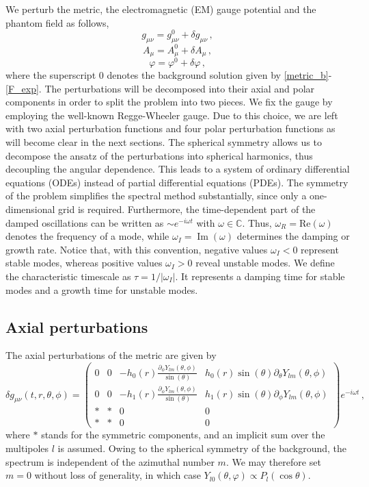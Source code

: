 \documentclass[11pt,a4paper]{article}
\begin{document}
We perturb the metric, the electromagnetic (EM) gauge potential and the phantom field as follows,
\begin{equation}
    g_{\mu\nu}=g_{\mu\nu}^0+\delta g_{\mu\nu} \, ,
\end{equation}
%
\begin{equation}
    A_{\mu}=A_{\mu}^0+\delta A_{\mu} \, ,
\end{equation}
%
\begin{equation}
    \varphi=\varphi^0+\delta\varphi \, ,
\end{equation}
where the superscript $0$ denotes the background solution given by \eqref{metric_b}-\eqref{F_exp}. 
The perturbations will be decomposed into their axial and polar components in order to split the problem into two pieces. 
We fix the gauge by employing the well-known Regge-Wheeler gauge. 
Due to this choice, we are left with two axial perturbation functions and four polar perturbation functions as will become clear in the next sections.
The spherical symmetry allows us to decompose the ansatz of the perturbations into spherical harmonics, thus decoupling the angular dependence.
This leads to a system of ordinary differential equations (ODEs) instead of partial differential equations (PDEs). 
The symmetry of the problem simplifies the spectral method substantially, since only a one-dimensional grid is required.
Furthermore, the time-dependent part of the damped oscillations can be written as $\sim e^{-i\omega t}$ with $\omega\in \mathbb{C}$. 
Thus, $\omega_R=\text{Re}(\omega)$ denotes the frequency of a mode, while $\omega_I=\operatorname{Im}(\omega)$ determines the damping or growth rate.
Notice that, with this convention, negative values $\omega_I<0$ represent stable modes, whereas positive values $\omega_I>0$ reveal unstable modes. 
We define the characteristic timescale as $\tau=1/|\omega_I|$. 
It represents a damping time for stable modes and a growth time for unstable modes.


\subsection{Axial perturbations}


The axial perturbations of the metric are given by
%
\begin{equation}\label{deltag_axial}
    \delta g_{\mu\nu}(t,r,\theta,\phi)=\begin{pmatrix}
0 & 0 & -h_0(r)\frac{\partial_{\phi}Y_{lm}(\theta,\phi)}{\sin{(\theta)}} & h_0(r)\sin{(\theta)}\partial_{\theta}Y_{lm}(\theta,\phi)\\
0 & 0 & -h_1(r)\frac{\partial_{\phi}Y_{lm}(\theta,\phi)}{\sin{(\theta)}} & h_1(r)\sin{(\theta)}\partial_{\phi}Y_{lm}(\theta,\phi)\\
* & * & 0 & 0\\
* & * & 0 & 0
\end{pmatrix}e^{-i\omega t} \,,
\end{equation}
%
where $*$ stands for the symmetric components, and an implicit sum over the multipoles $l$ is assumed. 
% 
Owing to the spherical symmetry of the background, the spectrum is independent of the azimuthal number $m$. 
We may therefore set $m=0$ without loss of generality, in which case $Y_{l0}(\theta,\varphi)\propto P_l(\cos\theta)$.
\end{document}
